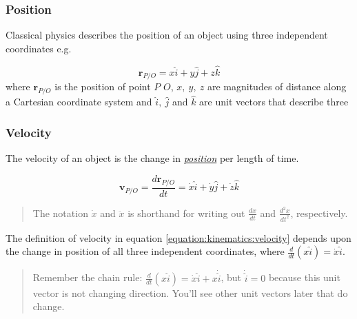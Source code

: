 \documentclass[letterpaper,10pt,english]{sphinxmanual}
\begin{document}
\subsubsection{Position}
\label{\detokenize{module_01/kinematics:position}}
Classical physics describes the position of an object using three
independent coordinates e.g.


\label{equation:module_01/kinematics:a54917d7-7520-45f3-9ae3-c9648fcb0ed4}\begin{equation}
\mathbf{r}_{P/O} = x\hat{i} + y\hat{j} + z\hat{k}
\end{equation}
where \(\mathbf{r}_{P/O}\) is the position of point \(P\)  \(O\), \(x,~y,~z\) are magnitudes of distance along a
Cartesian coordinate system and \(\hat{i},~\hat{j}\) and \(\hat{k}\) are
unit vectors that describe three

\begin{sphinxVerbatim}[commandchars=\\\{\}]
   
   
\end{sphinxVerbatim}


\subsubsection{Velocity}
\label{\detokenize{module_01/kinematics:velocity}}
The velocity of an object is the change in {\hyperref[\detokenize{module_01/kinematics:position}]{\emph{position}}} per length of time.

\label{equation:module_01/kinematics:3c98d8a4-e9bf-4aba-acab-99b7d3660a3a}\begin{equation}
\mathbf{v}_{P/O} = \frac{d\mathbf{r}_{P/O}}{dt} = \dot{x}\hat{i} + \dot{y}\hat{j} +
\dot{z}\hat{k}
\end{equation}\begin{quote}

 The notation \(\dot{x}\) and \(\ddot{x}\) is short\sphinxhyphen{}hand for writing out
\(\frac{dx}{dt}\) and \(\frac{d^2x}{dt^2}\), respectively.
\end{quote}

The definition of velocity in equation \eqref{equation:kinematics:velocity} depends upon the change in position of all
three independent coordinates, where
\(\frac{d}{dt}(x\hat{i})=\dot{x}\hat{i}\).
\begin{quote}

 Remember the chain rule:
\(\frac{d}{dt}(x\hat{i})=\dot{x}\hat{i} +
x\dot{\hat{i}}\), but \(\dot{\hat{i}}=0\) because this unit vector is not
changing direction. You’ll see other unit vectors later that do change.
\end{quote}
\end{document}
